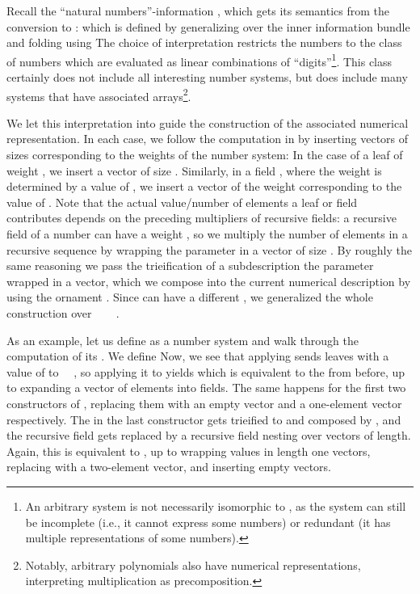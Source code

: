 Recall the ``natural numbers''-information , which gets its semantics from the conversion to \bN{}:
which is defined by generalizing over the inner information bundle and folding using
The choice of interpretation restricts the numbers to the class of numbers which are evaluated as linear combinations of ``digits''\footnote{An arbitrary  system is not necessarily isomorphic to \bN{}, as the system can still be incomplete (i.e., it cannot express some numbers) or redundant (it has multiple representations of some numbers).}. This class certainly does not include all interesting number systems, but does include many systems that have associated arrays\footnote{Notably, arbitrary polynomials also have numerical representations, interpreting multiplication as precomposition.}. 

We let this interpretation into \bN{} guide the construction of the associated numerical representation. In each case, we follow the computation in  by inserting vectors of sizes corresponding to the weights of the number system:
In the case of a leaf  of weight , we insert a vector of size . Similarly, in a field , where the weight is determined by a value  of , we insert a vector of the weight corresponding to the value of . Note that the actual value/number of elements a leaf or field contributes depends on the preceding multipliers of recursive fields: a recursive field of a number can have a weight , so we multiply the number of elements in a recursive sequence by wrapping the parameter in a vector of size . By roughly the same reasoning we pass the trieification of a subdescription  the parameter wrapped in a vector, which we compose into the current numerical description by using the ornament . Since  can have a different , we generalized the whole construction over \ \AV{:} \ \ .

As an example, let us define  as a number system and walk through the computation of its . We define
Now, we see that applying  sends leaves with a value of  to \ \ , so applying it to  yields
which is equivalent to the  from before, up to expanding a vector of  elements into  fields. The same happens for the first two constructors of , replacing them with an empty vector and a one-element vector respectively. The  in the last constructor gets trieified to  and composed by , and the recursive field gets replaced by a recursive field nesting over vectors of length. Again, this is equivalent to , up to wrapping values in length one vectors, replacing  with a two-element vector, and inserting empty vectors.

